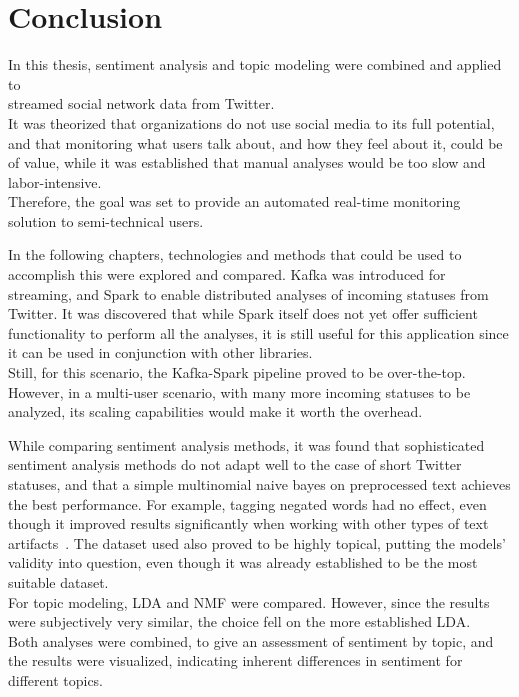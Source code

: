 \chapter{Conclusion}
\label{ch:conclusion}


In this thesis, sentiment analysis and topic modeling were combined and applied to \\streamed social network data from Twitter.\\
It was theorized that organizations do not use social media to its full potential,
and that monitoring what users talk about, and how they feel about it,
could be of value,
while it was established that manual analyses would be too slow and labor-intensive.\\
Therefore, the goal was set to provide an automated real-time monitoring solution to semi-technical users.

In the following chapters, technologies and methods that could be used to accomplish this were explored and compared.
Kafka was introduced for streaming, and Spark to enable distributed analyses of incoming statuses from Twitter.
It was discovered that while Spark itself does not yet offer sufficient functionality to perform all the analyses,
it is still useful for this application since it can be used in conjunction with other libraries.\\
Still, for this scenario, the Kafka-Spark pipeline proved to be over-the-top.
However, in a multi-user scenario, with many more incoming statuses to be analyzed,
its scaling capabilities would make it worth the overhead.

While comparing sentiment analysis methods, it was found that sophisticated sentiment analysis methods do not adapt well
to the case of short Twitter statuses, and that a simple multinomial naive bayes on preprocessed text achieves the
best performance.
For example, tagging negated words had no effect, even though it improved results significantly when working with
other types of text artifacts~\cite{Hoffmann2005}.
The dataset used also proved to be highly topical, putting the models' validity into question,
even though it was already established to be the most suitable dataset.\\
For topic modeling, LDA and NMF were compared.
However, since the results were subjectively very similar, the choice fell on the more established LDA.\\
Both analyses were combined, to give an assessment of sentiment by topic, and the results were visualized,
indicating inherent differences in sentiment for different topics.

